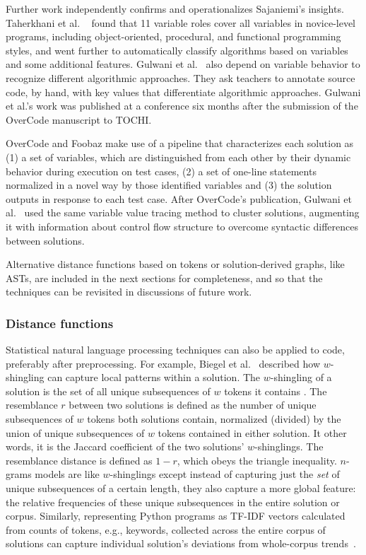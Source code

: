 Further work independently confirms and operationalizes Sajaniemi's insights. Taherkhani et al. ~\cite{taherkhani2010recognizing} found that 11 variable roles cover all variables in novice-level programs, including object-oriented, procedural, and functional programming styles, and went further to automatically classify algorithms based on variables and some additional features. Gulwani et al.~\cite{gulwani_fse14} also depend on variable behavior to recognize different algorithmic approaches. They ask teachers to annotate source code, by hand, with key values that differentiate algorithmic approaches. Gulwani et al.'s work was published at a conference six months after the submission of the OverCode manuscript to TOCHI.

OverCode and Foobaz make use of a pipeline that characterizes each solution as (1) a set of variables, which are distinguished from each other by their dynamic behavior during execution on test cases, (2) a set of one-line statements normalized in a novel way by those identified variables and (3) the solution outputs in response to each test case. After OverCode's publication, Gulwani et al.~\cite{gulwani2016automated} used the same variable value tracing method to cluster solutions, augmenting it with information about control flow structure to overcome syntactic differences between solutions.

Alternative distance functions based on tokens or solution-derived graphs, like ASTs, are included in the next sections for completeness, and so that the techniques can be revisited in discussions of future work.

\subsubsection{Distance functions}

Statistical natural language processing techniques can also be applied to code, preferably after preprocessing. For example, Biegel et al.~\cite{Biegel} described how $w$-shingling can capture local patterns within a solution. The $w$-shingling of a solution is the set of all unique subsequences of $w$ tokens it contains \cite{BRODER19971157}. The resemblance $r$ between two solutions is defined as the number of unique subsequences of $w$ tokens both solutions contain, normalized (divided) by the union of unique subsequences of $w$ tokens contained in either solution. It other words, it is the Jaccard coefficient of the two solutions' $w$-shinglings. The resemblance distance is defined as $1-r$, which obeys the triangle inequality. $n$-grams models are like $w$-shinglings except instead of capturing just the {\it set} of unique subsequences of a certain length, they also capture a more global feature: the relative frequencies of these unique subsequences in the entire solution or corpus. Similarly, representing Python programs as TF-IDF vectors calculated from counts of tokens, e.g., keywords, collected across the entire corpus of solutions can capture individual solution's deviations from whole-corpus trends~\cite{Gaudencio}.

